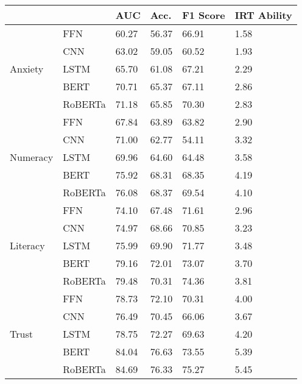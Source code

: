 \begin{tabular}{llllll}
\toprule
 &  & AUC & Acc. & F1 Score & IRT Ability \\
\midrule
\multirow[t]{5}{*}{Anxiety} & FFN & 60.27 & 56.37 & 66.91 & 1.58 \\
 & CNN & 63.02 & 59.05 & 60.52 & 1.93 \\
 & LSTM & 65.70 & 61.08 & 67.21 & 2.29 \\
 & BERT & 70.71 & 65.37 & 67.11 & 2.86 \\
 & RoBERTa & 71.18 & 65.85 & 70.30 & 2.83 \\
\cline{1-6}
\multirow[t]{5}{*}{Numeracy} & FFN & 67.84 & 63.89 & 63.82 & 2.90 \\
 & CNN & 71.00 & 62.77 & 54.11 & 3.32 \\
 & LSTM & 69.96 & 64.60 & 64.48 & 3.58 \\
 & BERT & 75.92 & 68.31 & 68.35 & 4.19 \\
 & RoBERTa & 76.08 & 68.37 & 69.54 & 4.10 \\
\cline{1-6}
\multirow[t]{5}{*}{Literacy} & FFN & 74.10 & 67.48 & 71.61 & 2.96 \\
 & CNN & 74.97 & 68.66 & 70.85 & 3.23 \\
 & LSTM & 75.99 & 69.90 & 71.77 & 3.48 \\
 & BERT & 79.16 & 72.01 & 73.07 & 3.70 \\
 & RoBERTa & 79.48 & 70.31 & 74.36 & 3.81 \\
\cline{1-6}
\multirow[t]{5}{*}{Trust} & FFN & 78.73 & 72.10 & 70.31 & 4.00 \\
 & CNN & 76.49 & 70.45 & 66.06 & 3.67 \\
 & LSTM & 78.75 & 72.27 & 69.63 & 4.20 \\
 & BERT & 84.04 & 76.63 & 73.55 & 5.39 \\
 & RoBERTa & 84.69 & 76.33 & 75.27 & 5.45 \\
\cline{1-6}
\bottomrule
\end{tabular}
